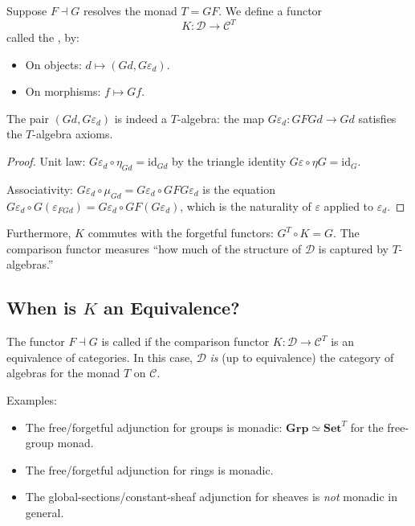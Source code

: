 Suppose $F \dashv G$ resolves the monad $T = GF$. We define a functor
\[
  K : \mathcal{D} \to \mathcal{C}^T
\]
called the , by:
\begin{itemize}
  \item On objects: $d \mapsto (Gd, G\varepsilon_d)$.
  \item On morphisms: $f \mapsto Gf$.
\end{itemize}

\begin{lemma}
The pair $(Gd, G\varepsilon_d)$ is indeed a $T$-algebra: the map
$G\varepsilon_d : GFGd \to Gd$ satisfies the $T$-algebra axioms.
\end{lemma}

\begin{proof}
Unit law: $G\varepsilon_d \circ \eta_{Gd} = \mathrm{id}_{Gd}$ by the
triangle identity $G\varepsilon \circ \eta G = \mathrm{id}_G$.

Associativity: $G\varepsilon_d \circ \mu_{Gd} = G\varepsilon_d \circ
GFG\varepsilon_d$ is the equation $G\varepsilon_d \circ G(\varepsilon_{FGd})
= G\varepsilon_d \circ GF(G\varepsilon_d)$, which is the naturality of
$\varepsilon$ applied to $\varepsilon_d$.
\end{proof}

Furthermore, $K$ commutes with the forgetful functors: $G^T \circ K = G$.
The comparison functor measures ``how much of the structure of $\mathcal{D}$
is captured by $T$-algebras.''

\subsection{When is $K$ an Equivalence?}

The functor $F \dashv G$ is called  if the comparison functor
$K : \mathcal{D} \to \mathcal{C}^T$ is an equivalence of categories. In this
case, $\mathcal{D}$ \emph{is} (up to equivalence) the category of algebras
for the monad $T$ on $\mathcal{C}$.

Examples:
\begin{itemize}
  \item The free/forgetful adjunction for groups is monadic: $\mathbf{Grp}
        \simeq \mathbf{Set}^T$ for the free-group monad.
  \item The free/forgetful adjunction for rings is monadic.
  \item The global-sections/constant-sheaf adjunction for sheaves is
        \emph{not} monadic in general.
\end{itemize}

